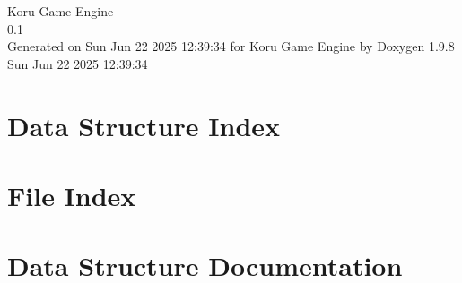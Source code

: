 \documentclass[twoside]{book}
\newcommand{\+}{\discretionary{\mbox{\scriptsize$\hookleftarrow$}}{}{}}
\newcommand{\clearemptydoublepage}{%
    \newpage{\pagestyle{empty}\cleardoublepage}%
  }
\begin{document}
  \raggedbottom
    \hypersetup{pageanchor=false,
                bookmarksnumbered=true,
                pdfencoding=unicode
               }
  \begin{titlepage}
  \vspace*{7cm}
  \begin{center}%
  {\Large Koru Game Engine}\\
  [1ex]\large 0.\+1 \\
  \vspace*{1cm}
  {\large Generated on Sun Jun 22 2025 12\+:39\+:34 for Koru Game Engine by Doxygen 1.9.8}\\
    \vspace*{0.5cm}
    {\small Sun Jun 22 2025 12:39:34}
  \end{center}
  \end{titlepage}
  \clearemptydoublepage
  \tableofcontents
  \clearemptydoublepage
  \hypersetup{pageanchor=true}

\chapter{Data Structure Index}

\chapter{File Index}

\chapter{Data Structure Documentation}




















\end{document}
